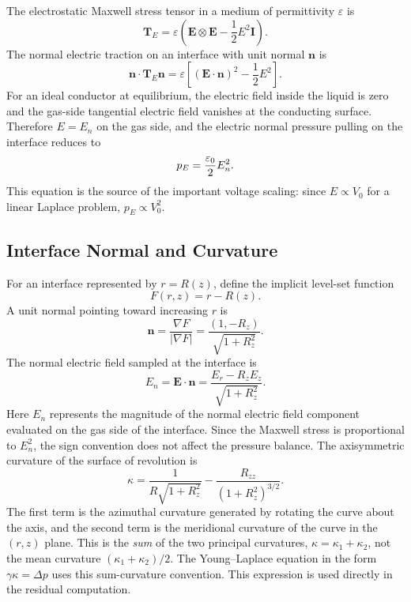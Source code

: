 The electrostatic Maxwell stress tensor in a medium of permittivity $\varepsilon$ is
\begin{equation}
    \mathbf{T}_E=\varepsilon\left(\mathbf{E}\otimes\mathbf{E}-\frac{1}{2}E^2\mathbf{I}\right).
\end{equation}
The normal electric traction on an interface with unit normal $\mathbf{n}$ is
\begin{equation}
    \mathbf{n}\cdot\mathbf{T}_E\mathbf{n}
    =\varepsilon\left[(\mathbf{E}\cdot\mathbf{n})^2-\frac{1}{2}E^2\right].
\end{equation}
For an ideal conductor at equilibrium, the electric field inside the liquid is zero and the gas-side tangential electric field vanishes at the conducting surface. Therefore $E=E_n$ on the gas side, and the electric normal pressure pulling on the interface reduces to
\begin{equation}
    p_E=\frac{\varepsilon_0}{2}E_n^2.
\label{eq:maxwell_pressure_full}
\end{equation}
This equation is the source of the important voltage scaling: since $E\propto V_0$ for a linear Laplace problem, $p_E\propto V_0^2$.

\subsection{Interface Normal and Curvature}

For an interface represented by $r=R(z)$, define the implicit level-set function
\begin{equation}
    F(r,z)=r-R(z).
\end{equation}
A unit normal pointing toward increasing $r$ is
\begin{equation}
    \mathbf{n}=\frac{\nabla F}{|\nabla F|}
    =\frac{(1,-R_z)}{\sqrt{1+R_z^2}}.
\end{equation}
The normal electric field sampled at the interface is
\begin{equation}
    E_n=\mathbf{E}\cdot\mathbf{n}
    =\frac{E_r-R_zE_z}{\sqrt{1+R_z^2}}.
\end{equation}
Here $E_n$ represents the magnitude of the normal electric field component evaluated on the gas side of the interface. Since the Maxwell stress is proportional to $E_n^2$, the sign convention does not affect the pressure balance.
The axisymmetric curvature of the surface of revolution is
\begin{equation}
\kappa = \frac{1}{R\sqrt{1+R_z^2}} - \frac{R_{zz}}{(1+R_z^2)^{3/2}}.
\label{eq:curvature_full}
\end{equation}
The first term is the azimuthal curvature generated by rotating the curve about the axis, and the second term is the meridional curvature of the curve in the $(r,z)$ plane. This is the \emph{sum} of the two principal curvatures, $\kappa=\kappa_1+\kappa_2$, not the mean curvature $(\kappa_1+\kappa_2)/2$. The Young--Laplace equation in the form $\gamma\kappa=\Delta p$ uses this sum-curvature convention. This expression is used directly in the residual computation.

